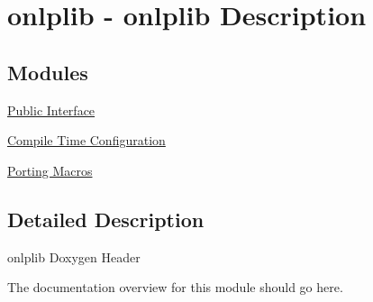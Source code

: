 \hypertarget{group__onlplib}{\section{onlplib -\/ onlplib Description}
\label{group__onlplib}
}
\subsection*{Modules}
\begin{DoxyCompactItemize}
\item 
\hyperlink{group__onlplib-onlplib}{Public Interface}
\item 
\hyperlink{group__onlplib-config}{Compile Time Configuration}
\item 
\hyperlink{group__onlplib-porting}{Porting Macros}
\end{DoxyCompactItemize}


\subsection{Detailed Description}
onlplib Doxygen Header

The documentation overview for this module should go here. 